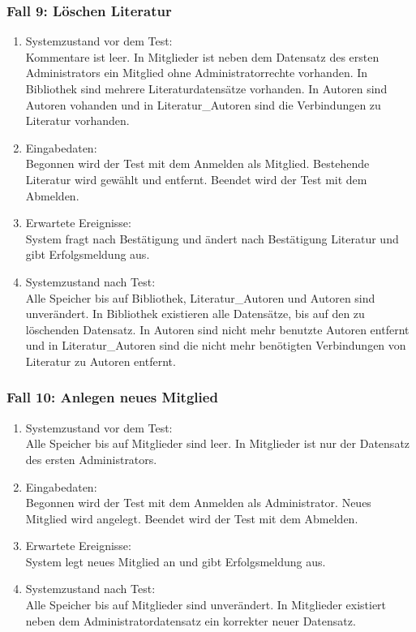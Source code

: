 \subsubsection{Fall 9: Löschen Literatur}
\begin{enumerate}
\item Systemzustand vor dem Test:\\
	Kommentare ist leer. In Mitglieder ist neben dem Datensatz des ersten Administrators ein Mitglied ohne Administratorrechte vorhanden. In Bibliothek sind mehrere Literaturdatensätze vorhanden. In Autoren sind Autoren vohanden und in Literatur\_Autoren sind die Verbindungen zu Literatur vorhanden.
\item Eingabedaten:\\
	Begonnen wird der Test mit dem Anmelden als Mitglied. Bestehende Literatur wird gewählt und entfernt. Beendet wird der Test mit dem Abmelden.
\item Erwartete Ereignisse:\\
	System fragt nach Bestätigung und ändert nach Bestätigung Literatur und gibt Erfolgsmeldung aus.
\item Systemzustand nach Test:\\
	Alle Speicher bis auf Bibliothek, Literatur\_Autoren und Autoren sind unverändert. In Bibliothek existieren alle Datensätze, bis auf den zu löschenden Datensatz. In Autoren sind nicht mehr benutzte Autoren entfernt und in Literatur\_Autoren sind die nicht mehr benötigten Verbindungen von Literatur zu Autoren entfernt.
\end{enumerate}

\subsubsection{Fall 10: Anlegen neues Mitglied}
\begin{enumerate}
\item Systemzustand vor dem Test:\\
	Alle Speicher bis auf Mitglieder sind leer. In Mitglieder ist nur der Datensatz des ersten Administrators.
\item Eingabedaten:\\
	Begonnen wird der Test mit dem Anmelden als Administrator. Neues Mitglied wird angelegt. Beendet wird der Test mit dem Abmelden.
\item Erwartete Ereignisse:\\
	System legt neues Mitglied an und gibt Erfolgsmeldung aus.
\item Systemzustand nach Test:\\
	Alle Speicher bis auf Mitglieder sind unverändert. In Mitglieder existiert neben dem Administratordatensatz ein korrekter neuer Datensatz.
\end{enumerate}

